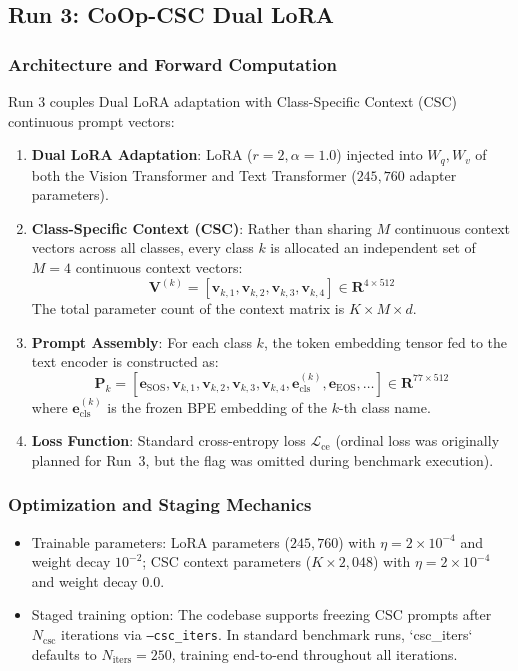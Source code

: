 \documentclass[letterpaper,11pt,leqno]{article}
\begin{document}
\newpage

\subsection{Run 3: CoOp-CSC Dual LoRA}

\subsubsection{Architecture and Forward Computation}
Run 3 couples Dual LoRA adaptation with Class-Specific Context (CSC) continuous prompt vectors:
\begin{enumerate}
    \item \textbf{Dual LoRA Adaptation}: LoRA ($r=2, \alpha=1.0$) injected into $W_q, W_v$ of both the Vision Transformer and Text Transformer ($245{,}760$ adapter parameters).
    \item \textbf{Class-Specific Context (CSC)}: Rather than sharing $M$ continuous context vectors across all classes, every class $k$ is allocated an independent set of $M=4$ continuous context vectors:
    \begin{equation}
        \bm{V}^{(k)} = [\bm{v}_{k, 1}, \bm{v}_{k, 2}, \bm{v}_{k, 3}, \bm{v}_{k, 4}] \in \mathbf{R}^{4 \times 512}
    \end{equation}
    The total parameter count of the context matrix is $K \times M \times d$.
    \item \textbf{Prompt Assembly}: For each class $k$, the token embedding tensor fed to the text encoder is constructed as:
    \begin{equation}
        \bm{P}_k = [\bm{e}_{\mathrm{SOS}}, \bm{v}_{k, 1}, \bm{v}_{k, 2}, \bm{v}_{k, 3}, \bm{v}_{k, 4}, \bm{e}_{\mathrm{cls}}^{(k)}, \bm{e}_{\mathrm{EOS}}, \dots] \in \mathbf{R}^{77 \times 512}
    \end{equation}
    where $\bm{e}_{\mathrm{cls}}^{(k)}$ is the frozen BPE embedding of the $k$-th class name.
    \item \textbf{Loss Function}: Standard cross-entropy loss $\mathcal{L}_{\mathrm{ce}}$ (ordinal loss was originally planned for Run~3, but the  flag was omitted during benchmark execution).
\end{enumerate}

\subsubsection{Optimization and Staging Mechanics}
\begin{itemize}
    \item Trainable parameters: LoRA parameters ($245{,}760$) with $\eta=2 \times 10^{-4}$ and weight decay $10^{-2}$; CSC context parameters ($K \times 2{,}048$) with $\eta=2 \times 10^{-4}$ and weight decay $0.0$.
    \item Staged training option: The codebase supports freezing CSC prompts after $N_{\mathrm{csc}}$ iterations via \texttt{--csc\_iters}. In standard benchmark runs, `csc\_iters` defaults to $N_{\mathrm{iters}} = 250$, training end-to-end throughout all iterations.
\end{itemize}
\end{document}
